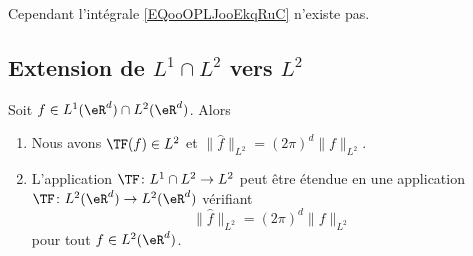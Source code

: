 Cependant l'intégrale \eqref{EQooOPLJooEkqRuC} n'existe pas.

\subsection{Extension de \( L^1\cap L^2\) vers \( L^2\)}

\begin{theorem}       \label{THOooJLCDooAjTvJf}
    Soit \( f\in L^1(\eR^d)\cap L^2(\eR^d)\). Alors
    \begin{enumerate}
        \item
            Nous avons \( \TF(f)\in L^2\) et \( \| \hat f\|_{L^2}= (2\pi)^d  \| f \|_{L^2}\).
        \item
            L'application \( \TF\colon L^1\cap L^2\to L^2\) peut être étendue en une application \( \TF\colon L^2(\eR^d)\to L^2(\eR^d)\) vérifiant
            \begin{equation}
                \| \hat f \|_{L^2}=(2\pi)^d\| f \|_{L^2}
            \end{equation}
            pour tout \( f\in L^2(\eR^d)\).
    \end{enumerate}
\end{theorem}

